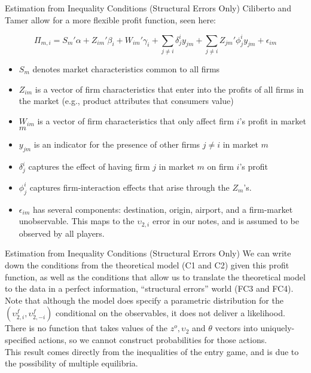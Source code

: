 \begin{frame}{\normalsize Estimation from Inequality Conditions (Structural Errors Only)}
Ciliberto and Tamer allow for a more flexible profit function, seen here:

\begin{equation*}
\Pi_{m,i} =S_m'\alpha + Z_{im}' \beta_i + W_{im}'\gamma_i + \sum_{j \neq i} \delta_{j}^{i}y_{jm} + \sum_{j \neq i} Z_{jm}'\phi_j^i y_{jm} + \epsilon_{im}
\end{equation*}

\noindent
\footnotesize
\begin{itemize}
\item $S_m$ denotes market characteristics common to all firms
\item $Z_{im}$ is a vector of firm characteristics that enter into the profits of all firms in the market (e.g., product attributes that consumers value)
\item $W_{im}$ is a vector of firm characteristics that only affect firm $i$'s profit in market $m$
\item $y_{jm}$ is an indicator for the presence of other firms $j\neq i$ in market $m$
\item $\delta_{j}^{i}$ captures the effect of having firm $j$ in market $m$ on firm $i$'s profit
\item $\phi_j^i$ captures firm-interaction effects that arise through the $Z_m$'s.
\item $\epsilon_{im}$ has several components: destination, origin, airport, and a firm-market unobservable.  This maps to the $\upsilon_{2,i}$ error in our notes, and is assumed to be observed by all players.
\end{itemize}
\end{frame}

\begin{frame}{\normalsize Estimation from Inequality Conditions (Structural Errors Only)}
We can write down the conditions from the theoretical model (C1 and C2) given this profit function, as well as the conditions that allow us to translate the theoretical model to the data in a perfect information, ``structural errors'' world (FC3 and FC4).  \\
\vspace{0.2in} 
Note that although the model
does specify a parametric distribution for the $(\upsilon
_{2,i}^{f},\upsilon _{2,-i}^{f})$ conditional on the observables, it does
not deliver a likelihood.  \\
\vspace{0.2in} There is no function that takes values of the $%
z^{o},\upsilon _{2}$ and $\theta $ vectors into uniquely-specified actions,
so we cannot construct probabilities for those actions.  \\
\vspace{0.2in} 
This result comes directly from the inequalities of the entry game, and is due to the possibility of multiple equilibria.  
\end{frame}

